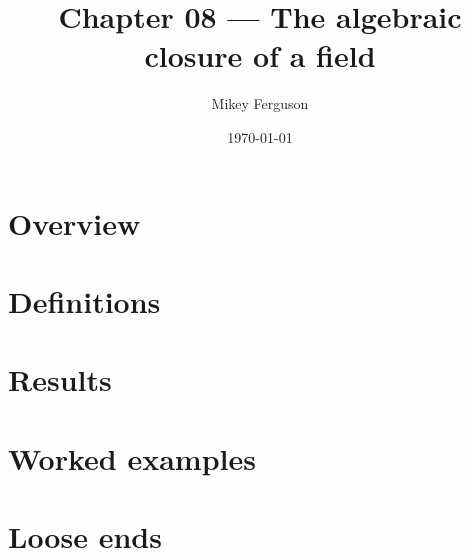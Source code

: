 \documentclass[11pt]{article}
\title{Chapter 08 --- The algebraic closure of a field}
\author{Mikey Ferguson}
\date{\today}
\begin{document}
\maketitle
\tableofcontents
\bigskip

\section{Overview}

\section{Definitions}

\section{Results}

\section{Worked examples}

\section{Loose ends}
\end{document}
